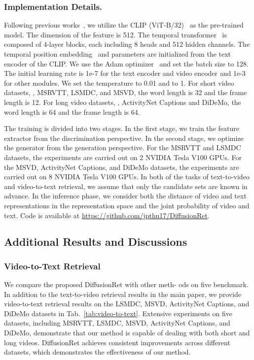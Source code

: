 \documentclass[10pt,twocolumn,letterpaper]{article}
\begin{document}
{\subsubsection{Implementation Details.}\label{apendix:Implementation}
Following previous works~\cite{luo2021clip4clip,jin2022expectation,jin2022video,jin2023text}, we utilize the CLIP (ViT-B/32)~\cite{radford2021learning} as the pre-trained model. The dimension of the feature is 512. The temporal transformer~\cite{vaswani2017attention,li2022locality} is composed of 4-layer blocks, each including 8 heads and 512 hidden channels. The temporal position embedding~\cite{yu2022position} and parameters are initialized from the text encoder of the CLIP. We use the Adam optimizer~\cite{kingma2014adam} and set the batch size to 128. The initial learning rate is 1e-7 for the text encoder and video encoder and 1e-3 for other modules. We set the temperature  to 0.01 and  to 1. For short video datasets, \ie, MSRVTT, LSMDC, and MSVD, the word length is 32 and the frame length is 12. For long video datasets, \ie, ActivityNet Captions and DiDeMo, the word length is 64 and the frame length is 64. 

The training is divided into two stages. In the first stage, we train the feature extractor from the discrimination perspective. In the second stage, we optimize the generator from the generation perspective. For the MSRVTT and LSMDC datasets, the experiments are carried out on 2 NVIDIA Tesla V100 GPUs. For the MSVD, ActivityNet Captions, and DiDeMo datasets, the experiments are carried out on 8 NVIDIA Tesla V100 GPUs. In both of the tasks of text-to-video and video-to-text retrieval, we assume that only the candidate sets are known in advance. In the inference phase, we consider both the distance of video and text representations in the representation space and the joint probability of video and text. Code is available at \href{https://github.com/jpthu17/DiffusionRet}{https://github.com/jpthu17/DiffusionRet}.

\subsection{Additional Results and Discussions}
\subsubsection{Video-to-Text Retrieval}\label{appendix:video-to-text}
We compare the proposed DiffusionRet with other meth-
ods on five benchmark. In addition to the text-to-video retrieval results in the main paper, we provide video-to-text retrieval results on the LSMDC, MSVD, ActivityNet Captions, and DiDeMo datasets in Tab.~{\ref{tab:video-to-text}}. Extensive experiments on five datasets, including MSRVTT, LSMDC, MSVD, ActivityNet Captions, and DiDeMo, demonstrate that our method is capable of dealing with both short and long videos. DiffusionRet achieves consistent improvements across different datasets, which demonstrates the effectiveness of our method. 

}
\end{document}

